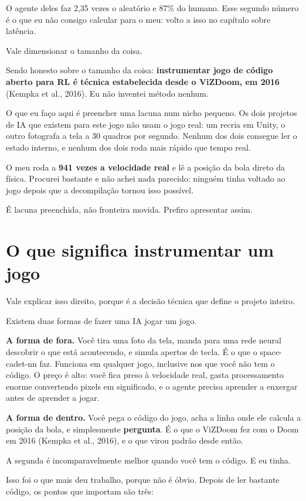 \documentclass[10pt,a4paper,twoside,twocolumn]{scrartcl}
\begin{document}
O agente deles faz 2,35 vezes o aleatório e 87\% do humano. Esse segundo
número é o que eu não consigo calcular para o meu: volto a isso no
capítulo sobre latência.

Vale dimensionar o tamanho da coisa.

Sendo honesto sobre o tamanho da coisa: \textbf{instrumentar jogo de
código aberto para RL é técnica estabelecida desde o ViZDoom, em 2016}
(Kempka et al., 2016). Eu não inventei método nenhum.

O que eu faço aqui é preencher uma lacuna num nicho pequeno. Os dois
projetos de IA que existem para este jogo não usam o jogo real: um
recria em Unity, o outro fotografa a tela a 30 quadros por segundo.
Nenhum dos dois consegue ler o estado interno, e nenhum dos dois roda
mais rápido que tempo real.

O meu roda a \textbf{941 vezes a velocidade real} e lê a posição da bola
direto da física. Procurei bastante e não achei nada parecido: ninguém
tinha voltado ao jogo depois que a decompilação tornou isso possível.

É lacuna preenchida, não fronteira movida. Prefiro apresentar assim.

\section{O que significa instrumentar um
jogo}\label{o-que-significa-instrumentar-um-jogo}

Vale explicar isso direito, porque é a decisão técnica que define o
projeto inteiro.

Existem duas formas de fazer uma IA jogar um jogo.

\textbf{A forma de fora.} Você tira uma foto da tela, manda para uma
rede neural descobrir o que está acontecendo, e simula apertos de tecla.
É o que o space-cadet-nn faz. Funciona em qualquer jogo, inclusive nos
que você não tem o código. O preço é alto: você fica preso à velocidade
real, gasta processamento enorme convertendo pixels em significado, e o
agente precisa aprender a enxergar antes de aprender a jogar.

\textbf{A forma de dentro.} Você pega o código do jogo, acha a linha
onde ele calcula a posição da bola, e simplesmente \textbf{pergunta}. É
o que o ViZDoom fez com o Doom em 2016 (Kempka et al., 2016), e o que
virou padrão desde então.

A segunda é incomparavelmente melhor quando você tem o código. E eu
tinha.

Isso foi o que mais deu trabalho, porque não é óbvio. Depois de ler
bastante código, os pontos que importam são três:
\end{document}
